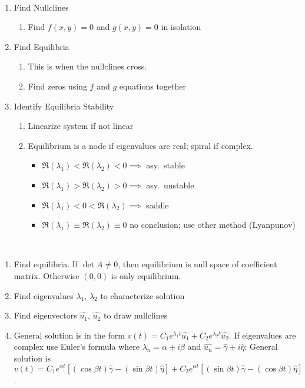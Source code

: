 \item[Two-Dimensional Nonlinear Systems] \hfill\\
  \begin{enumerate}
  \item Find Nullclines
    \begin{enumerate}
    \item Find $f(x,y)=0$ and $g(x,y)=0$ in isolation
    \end{enumerate}
  \item Find Equilibria
    \begin{enumerate}
    \item This is when the nullclines cross.
    \item Find zeros using $f$ and $g$ equations together
    \end{enumerate}
  \item Identify Equilibria Stability
    \begin{enumerate}
    \item Linearize system if not linear
    \item Equilibrium is a node if eigenvalues are real; spiral if complex.
      \begin{itemize}
      \item $\Re(\lambda_1) < \Re(\lambda_2) < 0 \implies$ asy.\ stable
      \item $\Re(\lambda_1) > \Re(\lambda_2) > 0 \implies$ asy.\ unstable
      \item $\Re(\lambda_1) < 0 < \Re(\lambda_2) \implies$ saddle
      \item $\Re(\lambda_1) \equiv \Re(\lambda_2) \equiv 0$ no conclusion; use
        other method (Lyanpunov)
      \end{itemize}
    \end{enumerate}
  \end{enumerate}

\item[Two-Dimensional Linear Systems] \hfill \\
  \begin{enumerate}
  \item Find equilibria. If $\det A\ne0$, then equilibrium is null space of
    coefficient matrix. Otherwise $(0,0)$ is only equilibrium.
  \item Find eigenvalues $\lambda_1$, $\lambda_2$ to characterize solution
  \item Find eigenvectors $\hat{u_1}$, $\hat{u_2}$ to draw nullclines
  \item General solution is in the form $v(t)=C_1e^{\lambda_1
      t}\hat{u_1}+C_2e^{\lambda_2 t}\hat{u_2}$. If eigenvalues are complex use
    Euler's formula where $\lambda_n=\alpha\pm i\beta$ and
    $\hat{u_n}=\hat{\gamma}\pm i\hat{\eta}$: General solution is $v(t) =
    C_1e^{\alpha t}[(\cos\beta t)\hat{\gamma} - (\sin\beta t)\hat{\eta}] +
    C_2e^{\alpha t}[(\sin\beta t)\hat{\gamma} - (\cos\beta t)\hat{\eta}]$.
  \end{enumerate}

